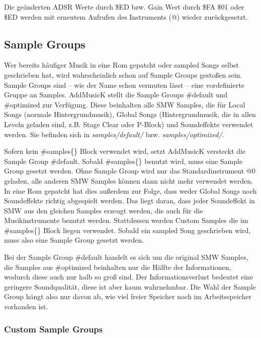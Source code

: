 Die geänderten ADSR Werte durch \$ED bzw. Gain Wert durch \$FA \$01 oder \$ED werden mit erneutem Aufrufen des Instruments (@) wieder zurückgesetzt.

\subsection{Sample Groups}

Wer bereits häufiger Musik in eine Rom gepatcht oder sampled Songs selbst geschrieben hat, wird wahrscheinlich schon auf Sample Groups gestoßen sein. \\
Sample Groups sind -- wie der Name schon vermuten lässt -- eine vordefinierte Gruppe an Samples. AddMusicK stellt die Sample Groups \#default und \#optimized zur Verfügung. Diese beinhalten alle SMW Samples, die für Local Songs (normale Hintergrundmusik), Global Songs (Hintergrundmusik, die in allen Leveln geladen sind, z.B. Stage Clear oder P-Block) und Soundeffekte verwendet werden.
Sie befinden sich in \textit{samples/default/} bzw. \textit{samples/optimized/}.

\bigskip

Sofern kein \#samples\{\} Block verwendet wird, setzt AddMusicK versteckt die Sample Group \#default. Sobald \#samples\{\} benutzt wird, muss eine Sample Group gesetzt werden.
Ohne Sample Group wird nur das Standardinstrument @0 geladen, alle anderen SMW Samples können dann nicht mehr verwendet werden. \\
In eine Rom gepatcht hat dies außerdem zur Folge, dass weder Global Songs noch Soundeffekte richtig abgespielt werden. Das liegt daran, dass jeder Soundeffekt in SMW aus den gleichen Samples erzeugt werden, die auch für die Musikinstrumente benutzt werden.
Stattdessen werden Custom Samples die im \#samples\{\} Block liegen verwendet. Sobald ein sampled Song geschrieben wird, muss also eine Sample Group gesetzt werden.

\bigskip

Bei der Sample Group \#default handelt es sich um die original SMW Samples, die Samples aus \#optimized beinhalten nur die Hälfte der Informationen, wodurch diese auch nur halb so groß sind.
Der Informationsverlust bedeutet eine geringere Soundqualität, diese ist aber kaum wahrnehmbar. Die Wahl der Sample Group hängt also nur davon ab, wie viel freier Speicher noch im Arbeitsspeicher vorhanden ist.

\subsubsection*{Custom Sample Groups}

